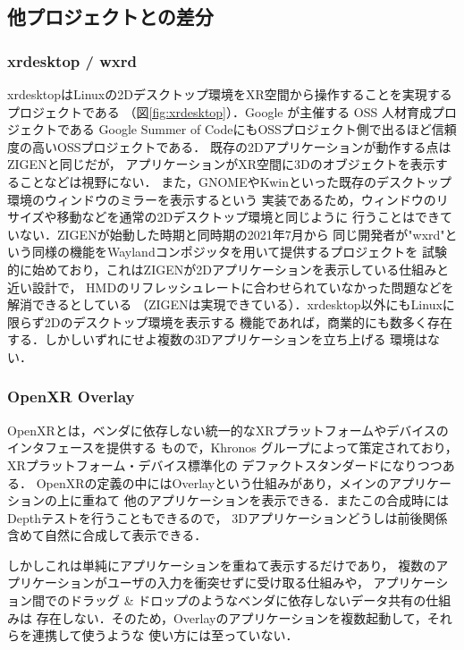 \subsection{他プロジェクトとの差分}
\label{section:project-uniqueness}

\subsubsection{xrdesktop / wxrd}

xrdesktopはLinuxの2Dデスクトップ環境をXR空間から操作することを実現するプロジェクトである
（図\ref{fig:xrdesktop}）．Google が主催する OSS 人材育成プロジェクトである
Google Summer of CodeにもOSSプロジェクト側で出るほど信頼度の高いOSSプロジェクトである．
既存の2Dアプリケーションが動作する点はZIGENと同じだが，
アプリケーションがXR空間に3Dのオブジェクトを表示することなどは視野にない．
また，GNOMEやKwinといった既存のデスクトップ環境のウィンドウのミラーを表示するという
実装であるため，ウィンドウのリサイズや移動などを通常の2Dデスクトップ環境と同じように
行うことはできていない．ZIGENが始動した時期と同時期の2021年7月から
同じ開発者が"wxrd"という同様の機能をWaylandコンポジッタを用いて提供するプロジェクトを
試験的に始めており，これはZIGENが2Dアプリケーションを表示している仕組みと近い設計で，
HMDのリフレッシュレートに合わせられていなかった問題などを解消できるとしている
（ZIGENは実現できている）．xrdesktop以外にもLinuxに限らず2Dのデスクトップ環境を表示する
機能であれば，商業的にも数多く存在する．しかしいずれにせよ複数の3Dアプリケーションを立ち上げる
環境はない．

\subsubsection{OpenXR Overlay}
\label{section:openxr-overlay}

OpenXRとは，ベンダに依存しない統一的なXRプラットフォームやデバイスのインタフェースを提供する
もので，Khronos グループによって策定されており，XRプラットフォーム・デバイス標準化の
デファクトスタンダードになりつつある．
OpenXRの定義の中にはOverlayという仕組みがあり，メインのアプリケーションの上に重ねて
他のアプリケーションを表示できる．またこの合成時にはDepthテストを行うこともできるので，
3Dアプリケーションどうしは前後関係含めて自然に合成して表示できる．

しかしこれは単純にアプリケーションを重ねて表示するだけであり，
複数のアプリケーションがユーザの入力を衝突せずに受け取る仕組みや，
アプリケーション間でのドラッグ \& ドロップのようなベンダに依存しないデータ共有の仕組みは
存在しない．そのため，Overlayのアプリケーションを複数起動して，それらを連携して使うような
使い方には至っていない．

